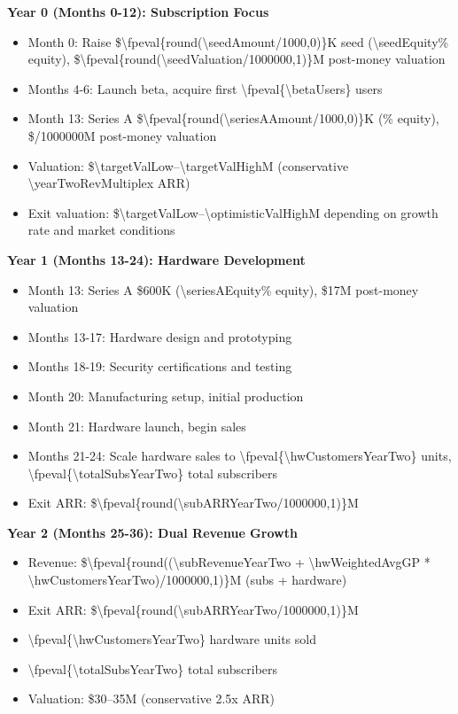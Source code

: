 \documentclass[11pt]{article}
\newcommand{\numfpeval}[1]{\num{\fpeval{#1}}}
\newcommand{\numint}[1]{\num[round-precision=0]{\fpeval{#1}}}
\begin{document}
\textbf{Year 0 (Months 0-12): Subscription Focus}
\begin{itemize}
  \item Month 0: Raise \$\numint{round(\seedAmount/1000,0)}K seed (\num{\seedEquity}\% equity), \$\numfpeval{round(\seedValuation/1000000,1)}M post-money valuation
  \item Months 4-6: Launch beta, acquire first \numint{\betaUsers} users
  \item Month 13: Series A \$\numint{round(\seriesAAmount/1000,0)}K ({\seriesAEquity}\% equity), \${\seriesAValuation/1000000}M post-money valuation
  \item Valuation: \$\num{\targetValLow}--\num{\targetValHigh}M (conservative \num{\yearTwoRevMultiple}x ARR)
  \item Exit valuation: \$\num{\targetValLow}--\num{\optimisticValHigh}M depending on growth rate and market conditions
\end{itemize}

\textbf{Year 1 (Months 13-24): Hardware Development}
\begin{itemize}
  \item Month 13: Series A \$600K (\num{\seriesAEquity}\% equity), \$17M post-money valuation
  \item Months 13-17: Hardware design and prototyping
  \item Months 18-19: Security certifications and testing
  \item Month 20: Manufacturing setup, initial production
  \item Month 21: Hardware launch, begin sales
  \item Months 21-24: Scale hardware sales to \numint{\hwCustomersYearTwo} units, \numint{\totalSubsYearTwo} total subscribers
  \item Exit ARR: \$\numfpeval{round(\subARRYearTwo/1000000,1)}M
\end{itemize}

\textbf{Year 2 (Months 25-36): Dual Revenue Growth}
\begin{itemize}
  \item Revenue: \$\numfpeval{round((\subRevenueYearTwo + \hwWeightedAvgGP * \hwCustomersYearTwo)/1000000,1)}M (subs + hardware)
  \item Exit ARR: \$\numfpeval{round(\subARRYearTwo/1000000,1)}M
  \item \numint{\hwCustomersYearTwo} hardware units sold
  \item \numint{\totalSubsYearTwo} total subscribers
  \item Valuation: \$30--35M (conservative \num{2.5}x ARR)
\end{itemize}
\end{document}
